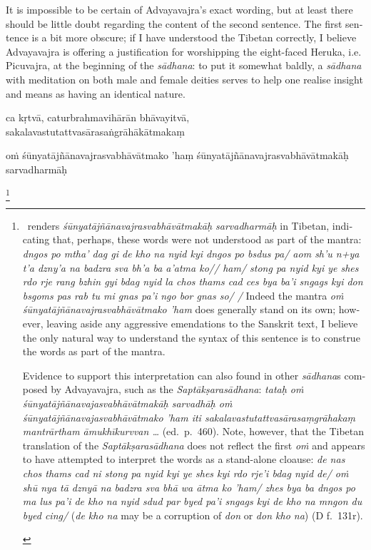 \documentclass[naipra.tex]{subfiles}
\begin{document}
\begin{sanskrit}
{\begin{english}
	It is impossible to be certain of Advayavajra's exact wording, but at least there should be little doubt regarding the content of the second sentence.
	The first sentence is a bit more obscure; if I have understood the Tibetan correctly, I believe Advayavajra is offering a justification for worshipping the eight-faced Heruka, i.e. Picuvajra, at the beginning of the \emph{sādhana}: to put it somewhat baldly, a \emph{sādhana} with meditation on both male and female deities serves to help one realise insight and means as having an identical nature.
\end{english}} ca kṛtvā, caturbrahmavihārān bhāvayitvā, sakalavastutattvasārasaṅgrāhākātmakaṃ \begin{mantra}oṁ śūnyatājñānavajrasvabhāvātmako 'haṃ śūnyatājñānavajrasvabhāvātmakāḥ sarvadharmāḥ\end{mantra}\footnote{\begin{english}
	\TIB\ renders \emph{śūnyatājñānavajrasvabhāvātmakāḥ sarvadharmāḥ} in Tibetan, indicating that, perhaps, these words were not understood as part of the mantra: \emph{dngos po mtha' dag gi de kho na nyid kyi dngos po bsdus pa/ aom sh'u n+ya t'a dzny'a na badzra sva bh'a ba a'atma ko// ham/ stong pa nyid kyi ye shes rdo rje rang bzhin gyi bdag nyid la chos thams cad ces bya ba'i sngags kyi don bsgoms pas rab tu mi gnas pa'i ngo bor gnas so/ /}
	Indeed the mantra \emph{oṁ śūnyatājñānavajrasvabhāvātmako 'ham} does generally stand on its own; however, leaving aside any aggressive emendations to the Sanskrit text, I believe the only natural way to understand the syntax of this sentence is to construe the words as part of the mantra.

	Evidence to support this interpretation can also found in other \emph{sādhana}s composed by Advayavajra, such as the \emph{Saptākṣarasādhana}: \emph{tataḥ oṁ śūnyatājñānavajasvabhāvātmakāḥ sarvadhāḥ oṁ śūnyatājñānavajasvabhāvātmako 'ham iti sakalavastutattvasārasaṃgrāhakaṃ mantrārtham āmukhīkurvvan \ldots } (ed.\ p.\ 460).
	Note, however, that the Tibetan translation of the \emph{Saptākṣarasādhana} does not reflect the first \emph{oṁ} and appears to have attempted to interpret the words as a stand-alone cloause: \emph{de nas chos thams cad ni stong pa nyid kyi ye shes kyi rdo rje'i bdag nyid de/ oṁ shū nya tā dznyā na badzra sva bhā wa ātma ko 'ham/ zhes bya ba dngos po ma lus pa'i de kho na nyid sdud par byed pa'i sngags kyi de kho na mngon du byed cing/} (\emph{de kho na} may be a corruption of \emph{don} or \emph{don kho na}) (D f.\ 131r).


\end{english}}
\end{sanskrit}
\end{document}

